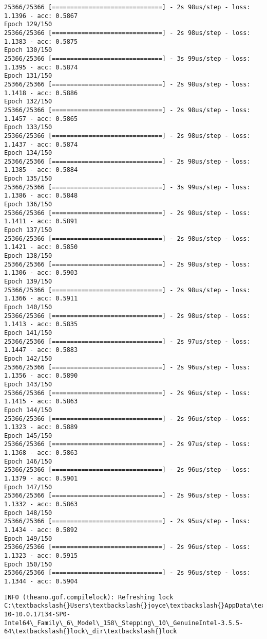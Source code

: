 \documentclass[11pt]{article}
\begin{document}
\begin{Verbatim}[commandchars=\\\{\}]
25366/25366 [==============================] - 2s 98us/step - loss: 1.1396 - acc: 0.5867
Epoch 129/150
25366/25366 [==============================] - 2s 98us/step - loss: 1.1383 - acc: 0.5875
Epoch 130/150
25366/25366 [==============================] - 3s 99us/step - loss: 1.1395 - acc: 0.5874
Epoch 131/150
25366/25366 [==============================] - 2s 98us/step - loss: 1.1418 - acc: 0.5886
Epoch 132/150
25366/25366 [==============================] - 2s 98us/step - loss: 1.1457 - acc: 0.5865
Epoch 133/150
25366/25366 [==============================] - 2s 98us/step - loss: 1.1437 - acc: 0.5874
Epoch 134/150
25366/25366 [==============================] - 2s 98us/step - loss: 1.1385 - acc: 0.5884
Epoch 135/150
25366/25366 [==============================] - 3s 99us/step - loss: 1.1386 - acc: 0.5848
Epoch 136/150
25366/25366 [==============================] - 2s 98us/step - loss: 1.1411 - acc: 0.5891
Epoch 137/150
25366/25366 [==============================] - 2s 98us/step - loss: 1.1421 - acc: 0.5850
Epoch 138/150
25366/25366 [==============================] - 2s 98us/step - loss: 1.1306 - acc: 0.5903
Epoch 139/150
25366/25366 [==============================] - 2s 98us/step - loss: 1.1366 - acc: 0.5911
Epoch 140/150
25366/25366 [==============================] - 2s 98us/step - loss: 1.1413 - acc: 0.5835
Epoch 141/150
25366/25366 [==============================] - 2s 97us/step - loss: 1.1447 - acc: 0.5883
Epoch 142/150
25366/25366 [==============================] - 2s 96us/step - loss: 1.1356 - acc: 0.5890
Epoch 143/150
25366/25366 [==============================] - 2s 96us/step - loss: 1.1415 - acc: 0.5863
Epoch 144/150
25366/25366 [==============================] - 2s 96us/step - loss: 1.1323 - acc: 0.5889
Epoch 145/150
25366/25366 [==============================] - 2s 97us/step - loss: 1.1368 - acc: 0.5863
Epoch 146/150
25366/25366 [==============================] - 2s 96us/step - loss: 1.1379 - acc: 0.5901
Epoch 147/150
25366/25366 [==============================] - 2s 96us/step - loss: 1.1332 - acc: 0.5863
Epoch 148/150
25366/25366 [==============================] - 2s 95us/step - loss: 1.1434 - acc: 0.5892
Epoch 149/150
25366/25366 [==============================] - 2s 96us/step - loss: 1.1323 - acc: 0.5915
Epoch 150/150
25366/25366 [==============================] - 2s 96us/step - loss: 1.1344 - acc: 0.5904

    \end{Verbatim}

    \begin{Verbatim}[commandchars=\\\{\}]
INFO (theano.gof.compilelock): Refreshing lock C:\textbackslash{}Users\textbackslash{}joyce\textbackslash{}AppData\textbackslash{}Local\textbackslash{}Theano\textbackslash{}compiledir\_Windows-10-10.0.17134-SP0-Intel64\_Family\_6\_Model\_158\_Stepping\_10\_GenuineIntel-3.5.5-64\textbackslash{}lock\_dir\textbackslash{}lock

    \end{Verbatim}
\end{document}
